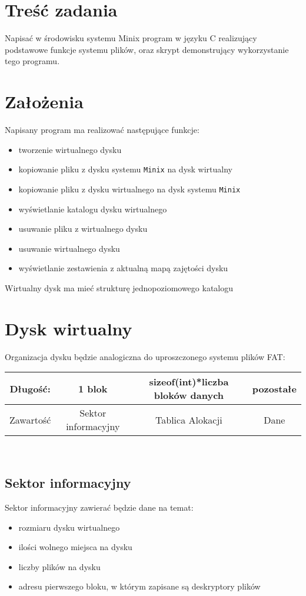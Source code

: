 \documentclass[12pt,a4paper]{article}
\begin{document}
\section{Treść zadania}
Napisać w środowisku systemu Minix program w języku C realizujący podstawowe funkcje systemu plików, oraz skrypt demonstrujący wykorzystanie tego programu.

\section{Założenia}
Napisany program ma realizować następujące funkcje:
\begin{itemize}
\item tworzenie wirtualnego dysku
\item kopiowanie pliku z dysku systemu \texttt{Minix} na dysk wirtualny
\item kopiowanie pliku z dysku wirtualnego na dysk systemu \texttt{Minix}
\item wyświetlanie katalogu dysku wirtualnego
\item usuwanie pliku z wirtualnego dysku
\item usuwanie wirtualnego dysku
\item wyświetlanie zestawienia z aktualną mapą zajętości dysku
\end{itemize}
Wirtualny dysk ma mieć strukturę jednopoziomowego katalogu

\section{Dysk wirtualny}
Organizacja dysku będzie analogiczna do uproszczonego systemu plików FAT:\\

\begin{tabular}{c|c|c|c}
Długość: & 1 blok & sizeof(int)*liczba bloków danych & pozostałe\\\hline
Zawartość & Sektor informacyjny & Tablica Alokacji & Dane
\end{tabular}\\

\subsection{Sektor informacyjny}
Sektor informacyjny zawierać będzie dane na temat:
\begin{itemize}
\item rozmiaru dysku wirtualnego
\item ilości wolnego miejsca na dysku
\item liczby plików na dysku
\item adresu pierwszego bloku, w którym zapisane są deskryptory plików
\end{itemize}
\end{document}
